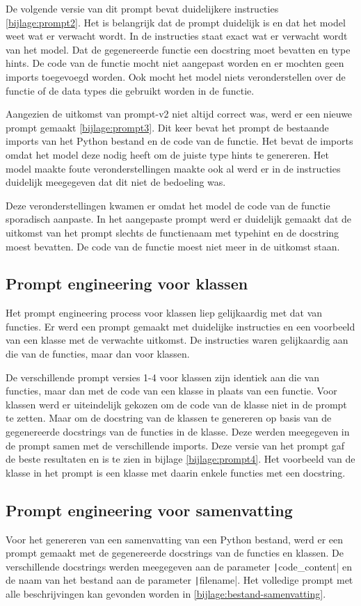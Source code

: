 De volgende versie van dit prompt bevat duidelijkere instructies \ref{bijlage:prompt2}.
Het is belangrijk dat de prompt duidelijk is en dat het model weet wat er verwacht wordt. 
In de instructies staat exact wat er verwacht wordt van het model. Dat de gegenereerde functie een docstring moet bevatten en type hints.
De code van de functie mocht niet aangepast worden en er mochten geen imports toegevoegd worden.
Ook mocht het model niets veronderstellen over de functie of de data types die gebruikt worden in de functie.

Aangezien de uitkomst van prompt-v2 niet altijd correct was, werd er een nieuwe prompt gemaakt \ref{bijlage:prompt3}.
Dit keer bevat het prompt de bestaande imports van het Python bestand en de code van de functie.
Het bevat de imports omdat het model deze nodig heeft om de juiste type hints te genereren.
Het model maakte foute veronderstellingen maakte ook al werd er in de instructies duidelijk meegegeven dat dit niet de bedoeling was.

Deze veronderstellingen kwamen er omdat het model de code van de functie sporadisch aanpaste.
In het aangepaste prompt werd er duidelijk gemaakt dat de uitkomst van het prompt slechts de functienaam met typehint en de docstring moest bevatten.
De code van de functie moest niet meer in de uitkomst staan.

\subsection{Prompt engineering voor klassen}
Het prompt engineering process voor klassen liep gelijkaardig met dat van functies.
Er werd een prompt gemaakt met duidelijke instructies en een voorbeeld van een klasse met de verwachte uitkomst.
De instructies waren gelijkaardig aan die van de functies, maar dan voor klassen.

De verschillende prompt versies 1-4 voor klassen zijn identiek aan die van functies, maar dan met de code van een klasse in plaats van een functie.
Voor klassen werd er uiteindelijk gekozen om de code van de klasse niet in de prompt te zetten.
Maar om de docstring van de klassen te genereren op basis van de gegenereerde docstrings van de functies in de klasse.
Deze werden meegegeven in de prompt samen met de verschillende imports.
Deze versie van het prompt gaf de beste resultaten en is te zien in bijlage \ref{bijlage:prompt4}.
Het voorbeeld van de klasse in het prompt is een klasse met daarin enkele functies met een docstring.

\subsection{Prompt engineering voor samenvatting}
Voor het genereren van een samenvatting van een Python bestand, werd er een prompt gemaakt met de gegenereerde docstrings van de functies en klassen.
De verschillende docstrings werden meegegeven aan de parameter \texttt|code_content| en de naam van het bestand aan de parameter 
\texttt|filename|.
Het volledige prompt met alle beschrijvingen kan gevonden worden in \ref{bijlage:bestand-samenvatting}.

